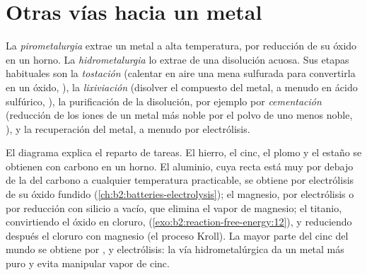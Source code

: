 \section{Otras vías hacia un metal}

\begin{definition}\label{def:b2:ellingham:metallurgy}
La \emph{pirometalurgia} extrae un metal a alta
temperatura, por reducción de su óxido en un horno. La \emph{hidrometalurgia}
lo extrae de una disolución acuosa. Sus etapas habituales son la
\emph{tostación} (calentar en aire una mena sulfurada para convertirla en
un óxido, ), la \emph{lixiviación}
(disolver el compuesto del metal, a menudo en ácido sulfúrico, ), la purificación de la disolución, por ejemplo por
\emph{cementación} (reducción de los iones de un metal más noble
por el polvo de uno menos noble, ), y la
recuperación del metal, a menudo por electrólisis.
\end{definition}

El diagrama explica el reparto de tareas. El hierro, el cinc, el plomo y el estaño se obtienen con
carbono en un horno. El aluminio, cuya recta está muy por debajo de la del carbono a cualquier
temperatura practicable, se obtiene por electrólisis de su óxido fundido
(\cref{ch:b2:batteries-electrolysis}); el magnesio, por electrólisis o por
reducción con silicio a vacío, que elimina el vapor de magnesio;
el titanio, convirtiendo el óxido en cloruro,  (\cref{exo:b2:reaction-free-energy:12}), y reduciendo después el cloruro con
magnesio (el proceso Kroll). La mayor parte del cinc del mundo se obtiene por ,
 y electrólisis: la vía hidrometalúrgica da un metal más puro y
evita manipular vapor de cinc.

